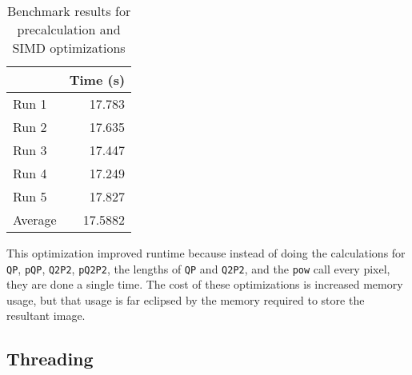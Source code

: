 \documentclass[12pt]{article}
\begin{document}

\begin{table}[H]
  \centering
  \begin{tabular}{lr}
    & {\bf Time (s)} \\
    \hline
    Run 1 & 17.783 \\
    Run 2 & 17.635 \\
    Run 3 & 17.447 \\
    Run 4 & 17.249 \\
    Run 5 & 17.827 \\
    \hline
    Average & 17.5882 \\
  \end{tabular}
  \caption{Benchmark results for precalculation and SIMD optimizations}
  \label{tbl-precalculation}
\end{table}

This optimization improved runtime because instead of doing the
calculations for \texttt{QP}, \texttt{pQP}, \texttt{Q2P2},
\texttt{pQ2P2}, the lengths of \texttt{QP} and \texttt{Q2P2}, and the
\texttt{pow} call every pixel, they are done a single time. The cost
of these optimizations is increased memory usage, but that usage is
far eclipsed by the memory required to store the resultant image.

\subsection*{Threading}
\end{document}
